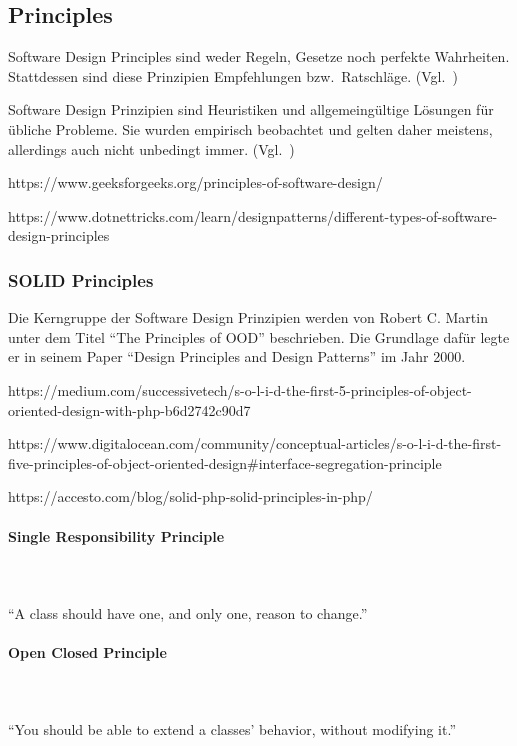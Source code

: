 \subsection{Principles}
Software Design Principles sind weder Regeln, Gesetze noch perfekte Wahrheiten.
Stattdessen sind diese Prinzipien Empfehlungen bzw.\ Ratschläge.
(Vgl.~\cite{getting-a-solid-start})

Software Design Prinzipien sind Heuristiken und allgemeingültige Lösungen für übliche Probleme.
Sie wurden empirisch beobachtet und gelten daher meistens, allerdings auch nicht unbedingt immer.
(Vgl.~\cite{getting-a-solid-start})

https://www.geeksforgeeks.org/principles-of-software-design/

https://www.dotnettricks.com/learn/designpatterns/different-types-of-software-design-principles

\subsubsection{SOLID Principles}
Die Kerngruppe der Software Design Prinzipien werden von Robert C. Martin unter dem Titel \enquote{The Principles of OOD}\cite{solid} beschrieben.
Die Grundlage dafür legte er in seinem Paper \enquote{Design Principles and Design Patterns}\cite{design-principles-and-design-patterns} im Jahr 2000.

https://medium.com/successivetech/s-o-l-i-d-the-first-5-principles-of-object-oriented-design-with-php-b6d2742c90d7

https://www.digitalocean.com/community/conceptual-articles/s-o-l-i-d-the-first-five-principles-of-object-oriented-design#interface-segregation-principle

https://accesto.com/blog/solid-php-solid-principles-in-php/

\paragraph{Single Responsibility Principle}
\\
\\
\enquote{A class should have one, and only one, reason to change.}\cite{solid}

\paragraph{Open Closed Principle}
\\
\\
\enquote{You should be able to extend a classes' behavior, without modifying it.}\cite{solid}

